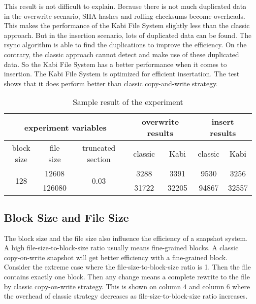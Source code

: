     This result is not difficult to explain. Because there is not much duplicated data in the overwrite scenario, SHA hashes and rolling checksums become overheads. This makes the performance of the Kabi File System slightly less than the classic approach. But in the insertion scenario, lots of duplicated data can be found. The rsync algorithm is able to find the duplications to improve the efficiency. On the contrary, the classic approach cannot detect and make use of these duplicated data. So the Kabi File System has a better performance when it comes to insertion. The Kabi File System is optimized for efficient insertation. The test shows that it does perform better than classic copy-and-write strategy.

\begin{table}[t]
\begin{center}
\begin{tabular}{|c|c|c|cccc|}
\hline
\multicolumn{3}{|c|}{experiment variables} & \multicolumn{2}{c|}{overwrite results} & \multicolumn{2}{c|}{insert results}\\
\hline
block size & file size & truncated section & \multicolumn{1}{c|}{classic} & \multicolumn{1}{c|}{Kabi} & \multicolumn{1}{c|}{classic} & Kabi\\
\hline
\multirow{2}{*}{128} & 12608 & \multirow{2}{*}{0.03} & 3288 & 3391 & 9530 & 3256 \\
& 126080 & & 31722 & 32205 & 94867 & 32557 \\
\hline
\end{tabular}
\end{center}
\caption{Sample result of the experiment}
\label{tab:sample_result}
\end{table}

\subsection{Block Size and File Size}

    The block size and the file size also influence the efficiency of a snapshot system. A high file-size-to-block-size ratio usually means fine-grained blocks. A classic copy-on-write snapshot will get better efficiency with a fine-grained block. Consider the extreme case where the file-size-to-block-size ratio is 1. Then the file contains exactly one block. Then any change means a complete rewrite to the file by classic copy-on-write strategy. This is shown on  column 4 and column 6 where the overhead of classic strategy decreases as file-size-to-block-size ratio increases.

